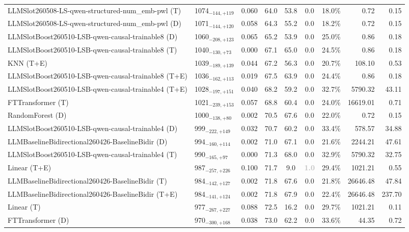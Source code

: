 \begin{tabular}{llcccccrr}
LLMSlot260508-LS-qwen-structured-num_emb-pwl (T) & 1074${}_{-144,+119}$ & 0.060 & 64.0 & 53.8 & 0.0 & 18.0\% & 0.72 & 0.15 \\
LLMSlot260508-LS-qwen-structured-num_emb-pwl (D) & 1071${}_{-144,+120}$ & 0.058 & 64.3 & 55.2 & 0.0 & 18.2\% & 0.72 & 0.15 \\
LLMSlotBoost260510-LSB-qwen-causal-trainable8 (D) & 1060${}_{-208,+123}$ & 0.065 & 65.2 & 53.9 & 0.0 & 25.0\% & 0.86 & 0.18 \\
LLMSlotBoost260510-LSB-qwen-causal-trainable8 (T) & 1040${}_{-130,+73}$ & 0.000 & 67.1 & 65.0 & 0.0 & 24.5\% & 0.86 & 0.18 \\
KNN (T+E) & 1039${}_{-189,+139}$ & 0.044 & 67.2 & 56.3 & 0.0 & 20.7\% & 108.10 & 0.53 \\
LLMSlotBoost260510-LSB-qwen-causal-trainable8 (T+E) & 1036${}_{-162,+113}$ & 0.019 & 67.5 & 63.9 & 0.0 & 24.4\% & 0.86 & 0.18 \\
LLMSlotBoost260510-LSB-qwen-causal-trainable4 (T+E) & 1028${}_{-197,+151}$ & 0.040 & 68.2 & 59.2 & 0.0 & 32.7\% & 5790.32 & 43.11 \\
FTTransformer (T) & 1021${}_{-239,+153}$ & 0.057 & 68.8 & 60.4 & 0.0 & 24.0\% & 16619.01 & 0.71 \\
RandomForest (D) & 1000${}_{-138,+80}$ & 0.002 & 70.5 & 67.6 & 0.0 & 22.0\% & 0.72 & 0.15 \\
LLMSlotBoost260510-LSB-qwen-causal-trainable4 (D) & 999${}_{-222,+149}$ & 0.032 & 70.7 & 60.2 & 0.0 & 33.4\% & 578.57 & 34.88 \\
LLMBaselineBidirectional260426-BaselineBidir (D) & 994${}_{-160,+114}$ & 0.002 & 71.0 & 67.1 & 0.0 & 21.6\% & 2244.21 & 47.61 \\
LLMSlotBoost260510-LSB-qwen-causal-trainable4 (T) & 990${}_{-165,+97}$ & 0.000 & 71.3 & 68.0 & 0.0 & 32.9\% & 5790.32 & 32.75 \\
Linear (T+E) & 987${}_{-257,+226}$ & 0.100 & 71.7 & 9.0 & \textcolor{silver}{\textbf{1.0}} & 29.4\% & 1021.21 & 0.55 \\
LLMBaselineBidirectional260426-BaselineBidir (T) & 984${}_{-142,+127}$ & 0.002 & 71.8 & 67.6 & 0.0 & 21.8\% & 26646.48 & 47.84 \\
LLMBaselineBidirectional260426-BaselineBidir (T+E) & 984${}_{-141,+124}$ & 0.002 & 71.8 & 67.9 & 0.0 & 22.4\% & 26646.48 & 237.70 \\
Linear (T) & 977${}_{-267,+227}$ & 0.088 & 72.5 & 16.2 & 0.0 & 29.7\% & 1021.21 & 0.11 \\
FTTransformer (D) & 970${}_{-300,+168}$ & 0.038 & 73.0 & 62.2 & 0.0 & 33.6\% & 44.35 & 0.72 \\

\end{tabular}
